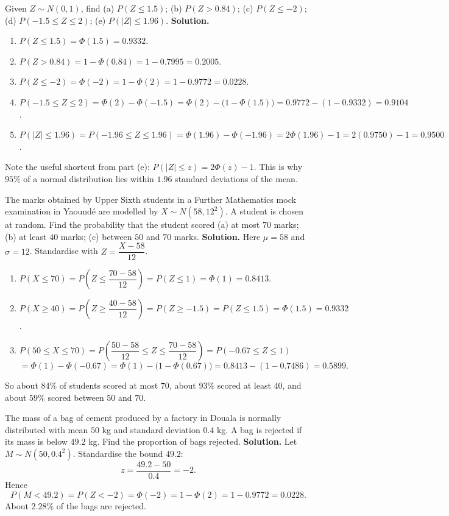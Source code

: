 \documentclass[11pt]{article}
\newcounter{popsec}
\newcounter{popsub}
\newcommand{\courssub}[1]{%
  \stepcounter{popsub}%
  \par\vspace{9pt}\noindent{\popxbold\fontsize{11.5}{13}\selectfont\color{popink}{\color{poporange}\thepopsec.\thepopsub}\hspace{6pt}#1}\par\nopagebreak\vspace{4pt}
}
\begin{document}
\begin{exoresolu}
Given $Z\sim N(0,1)$, find (a) $P(Z\le 1.5)$; (b) $P(Z>0.84)$; (c) $P(Z\le -2)$; (d) $P(-1.5\le Z\le 2)$; (e) $P(|Z|\le 1.96)$.
\tcblower
\textbf{Solution.}
\begin{enumerate}
\item $P(Z\le 1.5)=\Phi(1.5)=0.9332$.
\item $P(Z>0.84)=1-\Phi(0.84)=1-0.7995=0.2005$.
\item $P(Z\le -2)=\Phi(-2)=1-\Phi(2)=1-0.9772=0.0228$.
\item $P(-1.5\le Z\le 2)=\Phi(2)-\Phi(-1.5)=\Phi(2)-\bigl(1-\Phi(1.5)\bigr)=0.9772-(1-0.9332)=0.9104$.
\item $P(|Z|\le 1.96)=P(-1.96\le Z\le 1.96)=\Phi(1.96)-\Phi(-1.96)=2\Phi(1.96)-1=2(0.9750)-1=0.9500$.
\end{enumerate}
Note the useful shortcut from part (e): $P(|Z|\le z)=2\Phi(z)-1$. This is why $95\%$ of a normal distribution lies within $1.96$ standard deviations of the mean.
\end{exoresolu}

\courssub{Worked Examples with Real Data}

\begin{exoresolu}
The marks obtained by Upper Sixth students in a Further Mathematics mock examination in Yaoundé are modelled by $X\sim N(58, 12^2)$. A student is chosen at random. Find the probability that the student scored (a) at most $70$ marks; (b) at least $40$ marks; (c) between $50$ and $70$ marks.
\tcblower
\textbf{Solution.} Here $\mu=58$ and $\sigma=12$. Standardise with $Z=\dfrac{X-58}{12}$.
\begin{enumerate}
\item $P(X\le 70)=P\!\left(Z\le \dfrac{70-58}{12}\right)=P(Z\le 1)=\Phi(1)=0.8413$.
\item $P(X\ge 40)=P\!\left(Z\ge \dfrac{40-58}{12}\right)=P(Z\ge -1.5)=P(Z\le 1.5)=\Phi(1.5)=0.9332$.
\item $P(50\le X\le 70)=P\!\left(\dfrac{50-58}{12}\le Z\le \dfrac{70-58}{12}\right)=P(-0.67\le Z\le 1)$
\[
=\Phi(1)-\Phi(-0.67)=\Phi(1)-\bigl(1-\Phi(0.67)\bigr)=0.8413-(1-0.7486)=0.5899.
\]
\end{enumerate}
So about $84\%$ of students scored at most $70$, about $93\%$ scored at least $40$, and about $59\%$ scored between $50$ and $70$.
\end{exoresolu}

\begin{exoresolu}
The mass of a bag of cement produced by a factory in Douala is normally distributed with mean $50$ kg and standard deviation $0.4$ kg. A bag is rejected if its mass is below $49.2$ kg. Find the proportion of bags rejected.
\tcblower
\textbf{Solution.} Let $M\sim N(50, 0.4^2)$. Standardise the bound $49.2$:
\[
z=\frac{49.2-50}{0.4}=-2.
\]
Hence
\[
P(M<49.2)=P(Z<-2)=\Phi(-2)=1-\Phi(2)=1-0.9772=0.0228.
\]
About $2.28\%$ of the bags are rejected.
\end{exoresolu}
\end{document}
